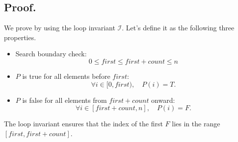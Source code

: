 \documentclass[12pt]{article}
\begin{document}
\subsection*{Proof.}

We prove by using the loop invariant \(\mathcal{I}\). Let's define it as the following three properties.
\begin{itemize}
    \item Search boundary check:
    \begin{equation}
        0 \leq first \leq first + count \leq n
    \end{equation}
    \item \(P\) is true for all elements before \(first\):
    \begin{equation}
        \forall i \in [0, first), \quad P(i) = T.
    \end{equation}
    \item \(P\) is false for all elements from \(first + count\) onward:
    \begin{equation}
        \forall i \in [first + count, n], \quad P(i) = F.
    \end{equation}
\end{itemize}
The loop invariant ensures that the index of the first \(F\) lies in the range \([first, first + count]\).
\end{document}
